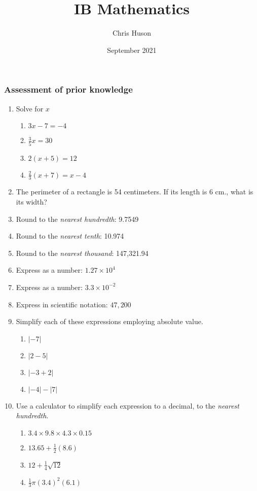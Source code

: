 \documentclass[12pt, twoside]{article}
\title{IB Mathematics}
\author{Chris Huson}
\date{September 2021}
\begin{document}
\subsubsection*{Assessment of prior knowledge}

\begin{enumerate}[itemsep=0.75cm]
  \item Solve for $x$
  \begin{multicols}{2}
    \begin{enumerate}[itemsep=3cm]
      \item $3x-7=-4$
      \item $\frac{3}{5}x =30$
      \item $2(x+5)=12$
      \item $\frac{2}{3}(x+7)=x-4$
    \end{enumerate}
  \end{multicols} \vspace{3cm}

  \item The perimeter of a rectangle is 54 centimeters. If its length is 6 cm., what is its width? \vspace{3cm}
  
  \item Round to the \emph{nearest hundredth}: 9.7549
  \item Round to the \emph{nearest tenth}: 10.974
  \item Round to the \emph{nearest thousand}: 147,321.94

  \item Express as a number: $1.27 \times 10^4$
  \item Express as a number: $3.3 \times 10^{-2}$
  \item Express in scientific notation: $47,200$
  
  \newpage
  \item Simplify each of these expressions employing absolute value.
  \begin{multicols}{2}
    \begin{enumerate}[itemsep=1.7cm]
      \item $|-7|$
      \item $|2-5|$
      \item $|-3+2|$
      \item $|-4|-|7|$
    \end{enumerate}
  \end{multicols}

  \item Use a calculator to simplify each expression to a decimal, to the \emph{nearest hundredth}.
  \begin{multicols}{2}
  \begin{enumerate}[itemsep=1.5cm]
    \item $3.4 \times 9.8 \times 4.3 \times 0.15$ 
    \item $13.65 + \frac{1}{2} (8.6)$  
    \item $12 + \frac{1}{4} \sqrt{12}$
    \item $\frac{1}{3} \pi (3.4)^2(6.1)$
  \end{enumerate}
  \end{multicols}\vspace{0.5cm}


\end{enumerate}
\end{document}
